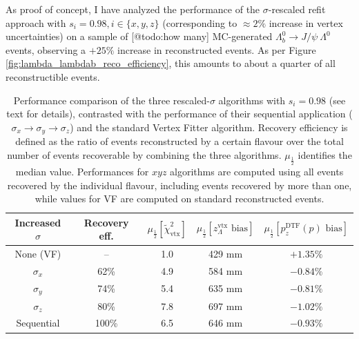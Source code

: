 As proof of concept, I have analyzed the performance of the $\sigma$-rescaled refit approach with $s_i=0.98, i\in\{x,y,z\}$ (corresponding to $\approx 2\%$ increase in vertex uncertainties) on a sample of [@todo:how many] MC-generated $\Lambda_b^0 \rightarrow J/\psi~\Lambda^0$ events, observing a $+25\%$ increase in reconstructed events.
As per Figure \ref{fig:lambda_lambdab_reco_efficiency}, this amounts to about a quarter of all reconstructible events.

\begin{table}[t]
	\begin{center}
	\begin{tabular}{|c||c|c|c|c|}
		\hline
		Increased $\sigma$ & Recovery eff. & $\mu_\frac{1}{2}\left[\tilde{\chi}^2_\text{vtx}\right]$ & $\mu_\frac{1}{2}\left[z_\Lambda^\text{vtx} \text{ bias}\right]$ & $\mu_\frac{1}{2}\left[p_z^\text{DTF} (p) \text{ bias}\right]$ \\
		\hline
		\hline
		None (VF)  & -- & 1.0 & 429 mm & $+1.35\%$ \\
		\hline
		$\sigma_x$ & 62\% & 4.9 & 584 mm & $-0.84\%$ \\
		$\sigma_y$ & 74\% & 5.4 & 635 mm & $-0.81\%$ \\
		$\sigma_z$ & 80\% & 7.8 & 697 mm & $-1.02\%$ \\
		\hline
		Sequential & 100\% & 6.5 & 646 mm & $-0.93\%$ \\
		\hline
	\end{tabular}
	\end{center}
	\caption[Performance comparison of the three rescaled-$\sigma$ algorithms.]{Performance comparison of the three rescaled-$\sigma$ algorithms with $s_i=0.98$ (see text for details), contrasted with the performance of their sequential application ($\sigma_x \rightarrow \sigma_y \rightarrow \sigma_z$) and the standard Vertex Fitter algorithm. Recovery efficiency is defined as the ratio of events reconstructed by a certain flavour over the total number of events recoverable by combining the three algorithms. $\mu_\frac{1}{2}$ identifies the median value. Performances for $xyz$ algorithms are computed using all events recovered by the individual flavour, including events recovered by more than one, while values for VF are computed on standard reconstructed events.}
	\label{tab:3:xyz_VF_performances}
\end{table}

